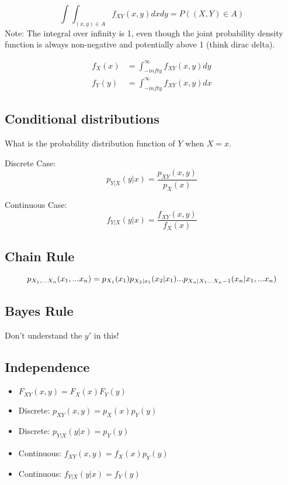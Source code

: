 \documentclass{article}
\begin{document}
    \begin{equation}
        \int \int_{(x,y) \in A} {f_{XY}(x,y)dxdy = P((X,Y) \in A)}
    \end{equation}
    Note: The integral over infinity is 1, even though the joint probability density function is always non-negative and potentially above 1 (think dirac delta).

    \begin{align}
        f_X(x) & = \int_{-infty}^{\infty}f_{XY}(x,y)dy \\
        f_Y(y) & = \int_{-infty}^{\infty}f_{XY}(x,y)dx
    \end{align}
        
    \subsection{Conditional distributions}
    What is the probability distribution function of $Y$ when $X=x$.
    \setlength{\parskip}{6pt}

    Discrete Case:
    \begin{equation}
        p_{Y|X}(y|x) = \frac{p_{XY}(x,y)}{p_X(x)}
    \end{equation}
    \setlength{\parskip}{6pt}
    
    Continuous Case:
    \begin{equation}
        f_{Y|X}(y|x)=\frac{f_{XY}(x,y)}{f_X(x)}
    \end{equation} 

    \subsection{Chain Rule}
    \begin{equation}
        p_{X_1,...X_n}(x_1,...x_n) \\ 
        = p_{X_1}(x_1)p_{X_2|x_1}(x_2 | x_1)...p_{X_n|X_1...X_n-1}(x_n|x_1,...x_n)
    \end{equation}

    \subsection{Bayes Rule}
    Don't understand the $y'$ in this!

    \subsection{Independence}
    \begin{itemize}
        \item $F_{XY}(x,y) = F_X(x)F_Y(y)$
        \item Discrete: $p_{XY}(x,y) = p_X(x)p_Y(y)$
        \item Discrete: $p_{Y|X}(y|x) = p_Y(y)$
        \item Continuous: $f_{XY}(x,y) = f_X(x)p_Y(y)$
        \item Continuous: $f_{Y|X}(y|x) = f_Y(y)$
    \end{itemize}
\end{document}
